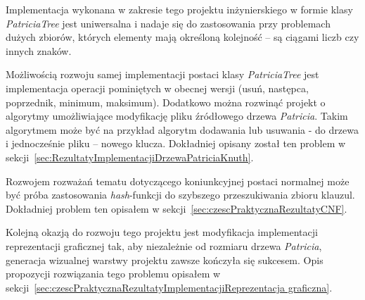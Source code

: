 	Implementacja wykonana w zakresie tego projektu inżynierskiego w formie klasy \emph{PatriciaTree} jest uniwersalna i nadaje się do zastosowania przy problemach dużych zbiorów, których elementy mają określoną kolejność -- są ciągami liczb czy innych znaków. 
	
	Możliwością rozwoju samej implementacji postaci klasy \emph{PatriciaTree} jest implementacja operacji pominiętych w obecnej wersji (usuń, następca, poprzednik, minimum, maksimum). Dodatkowo można rozwinąć projekt o algorytmy umożliwiające modyfikację pliku źródłowego drzewa \emph{Patricia}. Takim algorytmem może być na przykład algorytm dodawania lub usuwania - do drzewa i jednocześnie pliku -- nowego klucza. Dokładniej opisany został ten problem w sekcji~\ref{sec:RezultatyImplementacjiDrzewaPatriciaKnuth}.
	
	Rozwojem rozważań tematu dotyczącego koniunkcyjnej postaci normalnej może być próba zastosowania \emph{hash}-funkcji do szybszego przeszukiwania zbioru klauzul. Dokładniej problem ten opisałem w sekcji~\ref{sec:czescPraktycznaRezultatyCNF}.
	
	Kolejną okazją do rozwoju tego projektu jest modyfikacja implementacji reprezentacji graficznej tak, aby niezależnie od rozmiaru drzewa \emph{Patricia}, generacja wizualnej warstwy projektu zawsze kończyła się sukcesem. Opis propozycji rozwiązania tego problemu opisałem w sekcji~\ref{sec:czescPraktycznaRezultatyImplementacjiReprezentacja graficzna}.